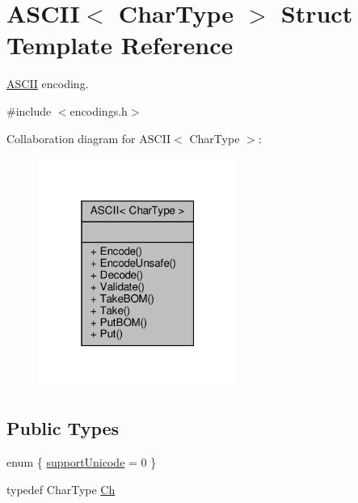 \hypertarget{structASCII}{}\section{A\+S\+C\+II$<$ Char\+Type $>$ Struct Template Reference}
\label{structASCII}


\hyperlink{structASCII}{A\+S\+C\+II} encoding.  




{\ttfamily \#include $<$encodings.\+h$>$}



Collaboration diagram for A\+S\+C\+II$<$ Char\+Type $>$\+:
\nopagebreak
\begin{figure}[H]
\begin{center}
\leavevmode
\includegraphics[width=184pt]{structASCII__coll__graph}
\end{center}
\end{figure}
\subsection*{Public Types}
\begin{DoxyCompactItemize}
\item 
enum \{ \hyperlink{structASCII_a59193e2783f1ec8e2c4c99a265c5c856a672ec36bd3404c3050a9111a934cbe00}{support\+Unicode} = 0
 \}
\item 
typedef Char\+Type \hyperlink{structASCII_a1baf6e7914f165be952c30db664cefb4}{Ch}
\end{DoxyCompactItemize}
